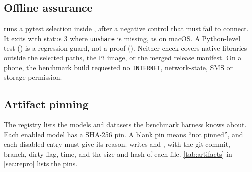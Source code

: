 \subsection{Offline assurance}

 runs a pytest selection inside , after a negative control that must fail to connect. It exits with status 3 where \texttt{unshare} is missing, as on macOS. A Python-level test () is a regression guard, not a proof (). Neither check covers native libraries outside the selected paths, the Pi image, or the merged release manifest. On a phone, the benchmark build requested no \texttt{INTERNET}, network-state, SMS or storage permission\prose.

\subsection{Artifact pinning}

The registry  lists the models and datasets the benchmark harness knows about. Each enabled model has a SHA-256 pin. A blank pin means ``not pinned'', and each disabled entry must give its reason.  writes  and , with the git commit, branch, dirty flag, time, and the size and hash of each file. \cref{tab:artifacts} in \cref{sec:repro} lists the pins.
